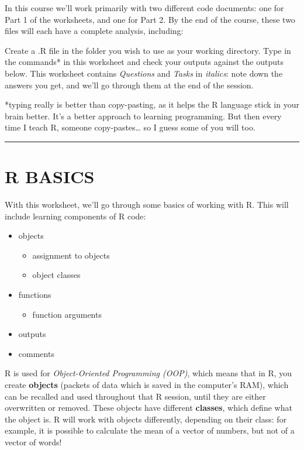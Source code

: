 \documentclass[
]{book}
\providecommand{\tightlist}{%
  \setlength{\itemsep}{0pt}\setlength{\parskip}{0pt}}
\begin{document}
In this course we'll work primarily with two different code documents: one
for Part 1 of the worksheets, and one for Part 2. By the end of the course,
these two files will each have a complete analysis, including:

Create a .R file in the folder you wish to use as your working directory. Type
in the commands* in this worksheet and check your outputs against the outputs
below. This worksheet contains \emph{Questions} and \emph{Tasks} in \emph{italics}: note
down the answers you get, and we'll go through them at the end of the session.

*typing really is better than copy-pasting, as it helps the R language stick in your
brain better. It's a better approach to learning programming. But then every time I teach R,
someone copy-pastes\ldots{} so I guess some of you will too.

\begin{center}\rule{0.5\linewidth}{\linethickness}\end{center}

\hypertarget{r-basics-1}{%
\section{R BASICS}\label{r-basics-1}}

With this worksheet, we'll go through some basics of working with R. This will
include learning components of R code:

\begin{itemize}
\tightlist
\item
  objects

  \begin{itemize}
  \tightlist
  \item
    assignment to objects
  \item
    object classes
  \end{itemize}
\item
  functions

  \begin{itemize}
  \tightlist
  \item
    function arguments
  \end{itemize}
\item
  outputs
\item
  comments\\
\end{itemize}

R is used for \emph{Object-Oriented Programming (OOP)}, which means that in R, you
create \textbf{objects} (packets of data which is saved in the computer's RAM), which
can be recalled and used throughout that R session, until they are either
overwritten or removed. These objects have different \textbf{classes}, which define
what the object is. R will work with objects differently, depending on their
class: for example, it is possible to calculate the mean of a vector of numbers,
but not of a vector of words!\\
~\\
\end{document}
